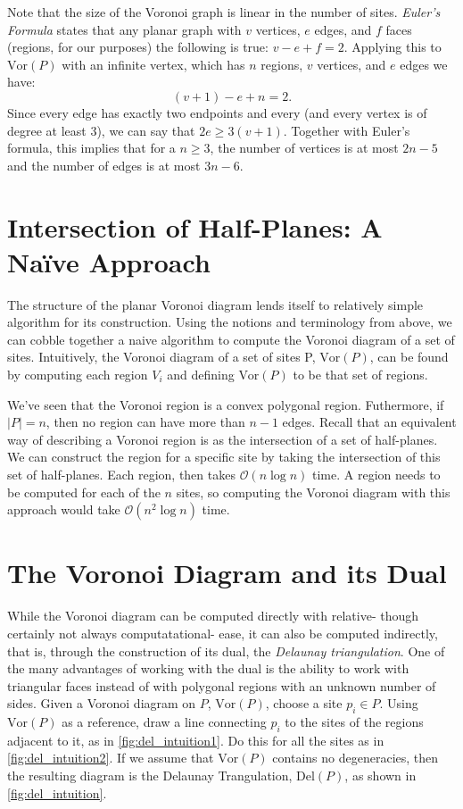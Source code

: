 \documentclass[12pt,twoside]{reedthesis}
\begin{document}
    Note that the size of the Voronoi graph is linear in the number of sites. \emph{Euler's Formula} states that any planar graph with $v$ vertices, $e$ edges, and $f$ faces (regions, for our purposes) the following is true:
    $v - e + f = 2.$ Applying this to $\mbox{Vor}(P)$ with an infinite vertex, which has $n$ regions, $v$ vertices, and $e$ edges we have:
    $$(v + 1) - e + n = 2.$$ Since every edge has exactly two endpoints and every (and every vertex is of degree at least 3), we can say that $2e \geq 3(v + 1)$. Together with Euler's formula, this implies that for a $n\geq 3$, the number of vertices is at most $2n -5$ and the number of edges is at most $3n -6$. 
  \section{Intersection of Half-Planes: A Na{\"i}ve Approach} %
  \label{sec:a_naive_approach}
    The structure of the planar Voronoi diagram lends itself to relatively simple algorithm for its construction. Using the notions and terminology from above, we can cobble together a naive algorithm to compute the Voronoi diagram of a set of sites. Intuitively, the Voronoi diagram of a set of sites P, $\mbox{Vor}(P)$, can be found by computing each region $V_{i}$ and defining $\mbox{Vor}(P)$ to be that set of regions. \par

    We've seen that the Voronoi region is a convex polygonal region. Futhermore, if $|P| = n$, then no region can have more than $n-1$ edges. Recall that an equivalent way of describing a Voronoi region is as the intersection of a set of half-planes. We can construct the region for a specific site by taking the intersection of this set of half-planes. Each region, then takes $\mathcal{O}(n\log n)$ time. A region needs to be computed for each of the $n$ sites, so computing the Voronoi diagram with this approach would take $\mathcal{O}(n^{2}\log n)$ time.
  
  \section{The Voronoi Diagram and its Dual} %
  \label{sec:the_voronoi_diagram_and_its_dual}
    While the Voronoi diagram can be computed directly with relative- though certainly not always computatational- ease, it can also be computed indirectly, that is, through the construction of its dual, the \emph{Delaunay triangulation}. One of the many advantages of working with the dual is the ability to work with triangular faces instead of with polygonal regions with an unknown number of sides. Given a Voronoi diagram on $P$, $\mbox{Vor}(P)$, choose a site $p_{i} \in P$. Using $\mbox{Vor}(P)$ as a reference, draw a line connecting $p_{i}$ to the sites of the regions adjacent to it, as in \cref{fig:del_intuition1}. Do this for all the sites as in \cref{fig:del_intuition2}. If we assume that $\mbox{Vor}(P)$ contains no degeneracies, then the resulting diagram is the Delaunay Trangulation, $\mbox{Del}(P)$, as shown in \cref{fig:del_intuition}.
\end{document}
